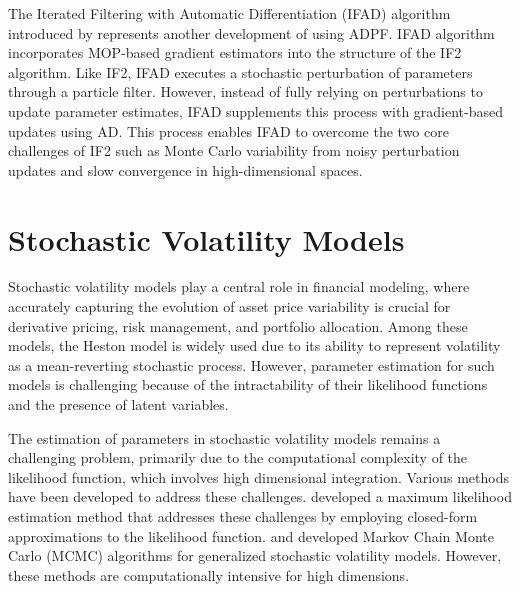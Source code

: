 \documentclass[11pt]{report}
\begin{document}
The Iterated Filtering with Automatic Differentiation (IFAD) algorithm introduced by \textbf{\citet{tan2024accelerated}} represents another development of using ADPF. IFAD algorithm incorporates MOP-based gradient estimators into the structure of the IF2 algorithm. Like IF2, IFAD executes a stochastic perturbation of parameters through a particle filter. However, instead of fully relying on perturbations to update parameter estimates, IFAD supplements this process with gradient-based updates using AD. This process enables IFAD to overcome the two core challenges of IF2 such as Monte Carlo variability from noisy perturbation updates and slow convergence in high-dimensional spaces.

\newpage
\section{Stochastic Volatility Models}
Stochastic volatility models play a central role in financial modeling, where accurately capturing the evolution of asset price variability is crucial for derivative pricing, risk management, and portfolio allocation. Among these models, the Heston model is widely used due to its ability to represent volatility as a mean-reverting stochastic process. However, parameter estimation for such models is challenging because of the intractability of their likelihood functions and the presence of latent variables.

The estimation of parameters in stochastic volatility models remains a challenging problem, primarily due to the computational complexity of the likelihood function, which involves high dimensional integration. Various methods have been developed to address these challenges. \textbf{\citet{ait2007maximum}} developed a maximum likelihood estimation method that addresses these challenges by employing closed-form approximations to the likelihood function. \textbf{\citet{chib2002markov}} and \textbf{\citet{chib2006analysis}} developed Markov Chain Monte Carlo (MCMC) algorithms for generalized stochastic volatility models. However, these methods are computationally intensive for high dimensions.

\end{document}
